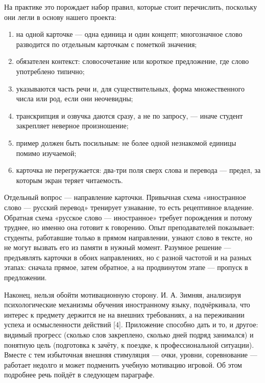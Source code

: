 \documentclass[11pt,a4paper,openany]{report}
\begin{document}
На практике это порождает набор правил, которые стоит перечислить, поскольку они легли в основу нашего проекта:

\begin{enumerate}

  \item на одной карточке — одна единица и один концепт; многозначное слово разводится по отдельным карточкам с пометкой значения;

  \item обязателен контекст: словосочетание или короткое предложение, где слово употреблено типично;

  \item указываются часть речи и, для существительных, форма множественного числа или род, если они неочевидны;

  \item транскрипция и озвучка даются сразу, а не по запросу, — иначе студент закрепляет неверное произношение;

  \item пример должен быть посильным: не более одной незнакомой единицы помимо изучаемой;

  \item карточка не перегружается: два-три поля сверх слова и перевода — предел, за которым экран теряет читаемость.

\end{enumerate}

Отдельный вопрос — направление карточки. Привычная схема «иностранное слово — русский перевод» тренирует узнавание, то есть рецептивное владение. Обратная схема «русское слово — иностранное» требует порождения и потому труднее, но именно она готовит к говорению. Опыт преподавателей показывает: студенты, работавшие только в прямом направлении, узнают слово в тексте, но не могут вызвать его из памяти в нужный момент. Разумное решение — предъявлять карточки в обоих направлениях, но с разной частотой и на разных этапах: сначала прямое, затем обратное, а на продвинутом этапе — пропуск в предложении.

Наконец, нельзя обойти мотивационную сторону. И. А. Зимняя, анализируя психологические механизмы обучения иностранному языку, подчёркивала, что интерес к предмету держится не на внешних требованиях, а на переживании успеха и осмысленности действий [4]. Приложение способно дать и то, и другое: видимый прогресс (сколько слов закреплено, сколько дней подряд занимался) и понятную цель (подготовка к зачёту, к поездке, к профессиональной ситуации). Вместе с тем избыточная внешняя стимуляция — очки, уровни, соревнование — работает недолго и может подменить учебную мотивацию игровой. Об этом подробнее речь пойдёт в следующем параграфе.
\end{document}

